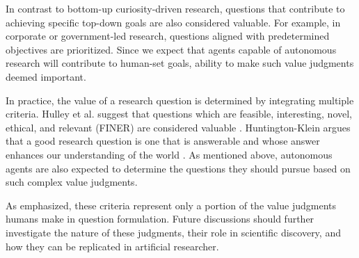 In contrast to bottom-up curiosity-driven research, questions that contribute to achieving specific top-down goals are also considered valuable. For example, in corporate or government-led research, questions aligned with predetermined objectives are prioritized. Since we expect that agents capable of autonomous research will contribute to human-set goals, ability to make such value judgments deemed important.


In practice, the value of a research question is determined by integrating multiple criteria. Hulley et al. suggest that questions which are feasible, interesting, novel, ethical, and relevant (FINER) are considered valuable \cite{hulley2007designing}. Huntington-Klein argues that a good research question is one that is answerable and whose answer enhances our understanding of the world \cite{huntington2021effect}. As mentioned above, autonomous agents are also expected to determine the questions they should pursue based on such complex value judgments.

As emphasized, these criteria represent only a portion of the value judgments humans make in question formulation. Future discussions should further investigate the nature of these judgments, their role in scientific discovery, and how they can be replicated in artificial researcher.




